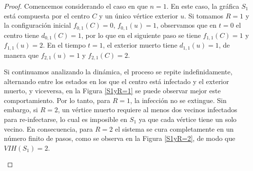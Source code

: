 \documentclass[12pt,titlepage,twoside,openright]{book}
\begin{document}
\begin{proof}
    Comencemos considerando el caso en que $n=1$. En este caso, la gr\'afica $S_1$ est\'a compuesta por el centro $C$ y un \'unico v\'ertice exterior $u$. Si tomamos $R=1$ y la configuraci\'on inicial $f_{0,1}(C)=0$, $f_{0,1}(u)=1$, observamos que en $t=0$ el centro tiene $d_{0,1}(C)=1$, por lo que en el siguiente paso se tiene $f_{1,1}(C)=1$ y $f_{1,1}(u)=2$. En el tiempo $t=1$, el exterior muerto tiene $d_{1,1}(u)=1$, de manera que $f_{2,1}(u)=1$ y $f_{2,1}(C)=2$. 
    
    Si continuamos analizando la din\'amica, el proceso se repite indefinidamente, alternando entre los estados en los que el centro est\'a infectado y el exterior muerto, y viceversa, en la Figura \ref{S1yR=1} se puede observar mejor este comportamiento. Por lo tanto, para $R=1$, la infecci\'on no se extingue. Sin embargo, si $R=2$, un v\'ertice muerto requiere al menos dos vecinos infectados para re-infectarse, lo cual es imposible en $S_1$ ya que cada v\'ertice tiene un solo vecino. En consecuencia, para $R=2$ el sistema se cura completamente en un n\'umero finito de pasos, como se observa en la Figura \ref{S1yR=2}, de modo que $VIH(S_1)=2$.
    
    \begin{figure}[h]
    \centering
    \begin{subfigure}[h]{0.65\linewidth}
\end{subfigure}
\end{figure}
\end{proof}
\end{document}

